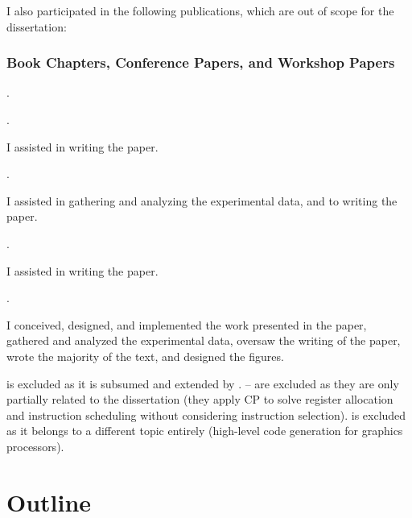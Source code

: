 I also participated in the following publications, which are out of scope for
the dissertation:

\subsubsection{Book Chapters, Conference Papers, and Workshop Papers}

\begin{publications}[resume]
  \item {}
    .
  \item {}
    .
    \begin{authorsContribution}
      I assisted in writing the paper.
    \end{authorsContribution}
  \item {}
    .
    \begin{authorsContribution}
      I assisted in gathering and analyzing the experimental data, and to
      writing the paper.
    \end{authorsContribution}
  \item {}
    .
    \begin{authorsContribution}
      I assisted in writing the paper.
    \end{authorsContribution}
  \item {}
    .
    \begin{authorsContribution}
      I conceived, designed, and implemented the work presented in the paper,
      gathered and analyzed the experimental data, oversaw the writing of the
      paper, wrote the majority of the text, and designed the figures.
    \end{authorsContribution}
\end{publications}
%
 is excluded as it is subsumed and extended by
. -- are
excluded as they are only partially related to the dissertation (they apply
\gls{CP} to solve \gls{register allocation} and \gls{instruction scheduling}
without considering \gls{instruction selection}).  is
excluded as it belongs to a different topic entirely (high-level code generation
for graphics processors).

\section{Outline}


